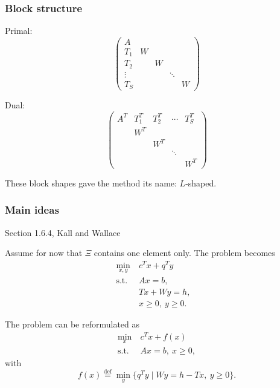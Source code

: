 \documentclass[aspectratio=169]{beamer}
\begin{document}
\begin{frame}
\frametitle{Block structure}

\begin{minipage}{0.49\textwidth}
Primal:
$$
\begin{pmatrix}
A \\
T_1 & W \\
T_2 & & W \\
\vdots & & & \ddots \\
T_S & & & & W
\end{pmatrix}
$$
\end{minipage}
\begin{minipage}{0.49\textwidth}
Dual:
	$$
	\begin{pmatrix}
	A^T & T_1^T & T_2^T & \cdots & T_S^T \\
	& W^T \\
	& & W^T \\
	& & & \ddots \\
	& & & & W^T
	\end{pmatrix}
	$$
\end{minipage}

\mbox{}

These block shapes gave the method its name: $L$-shaped.
\end{frame}

\begin{frame}
\frametitle{Main ideas}

{\red Section 1.6.4, Kall and Wallace}

Assume for now that $\Xi$ contains one element only.
The problem becomes
\begin{align*}
\min_{x,y}\ & c^Tx + q^Ty & \\
\text{s.t. } & Ax = b, \\
& Tx + Wy = h, \\
& x \geq 0,\ y \geq 0.
\end{align*}

The problem can be reformulated as
\begin{align*}
\min_x\ & c^Tx + f(x) \\
\text{s.t. } & Ax = b,\ x \geq 0,
\end{align*}
with
\[
f(x) \overset{\mathrm{def}}{=} \min_y \lbrace q^Ty \mid Wy = h - Tx,\ y \geq 0 \rbrace.
\]

\end{frame}
\end{document}
